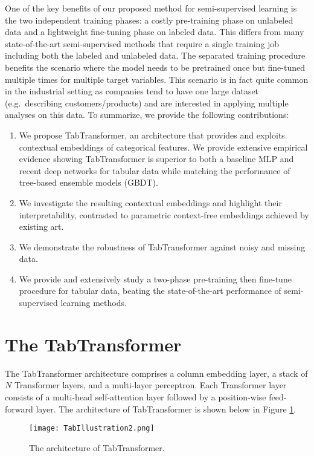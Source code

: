 One of the key benefits of our proposed method for semi-supervised learning is the two independent training phases: 
a costly pre-training phase on unlabeled data and a lightweight fine-tuning phase on labeled data. 
This differs from many state-of-the-art semi-supervised methods \citep{chapelle2009semi, oliver2018realistic, stretcu_graph_2019} that require a single training job including both the labeled and unlabeled data. 
The separated training procedure benefits the scenario where the model needs to be pretrained once but fine-tuned multiple times for multiple target variables.
This scenario is in fact quite common in the industrial setting as companies tend to have one large dataset (e.g.\ describing customers/products) and are interested in applying multiple analyses on this data. %
To summarize, we provide the following contributions: 
\begin{enumerate}
\item We propose TabTransformer, an architecture that provides and exploits contextual embeddings of categorical features. We provide extensive empirical evidence showing TabTransformer
is superior to both a baseline MLP and recent deep networks for tabular data while matching the performance of tree-based ensemble models (GBDT).

\item We investigate the resulting contextual embeddings and highlight their interpretability, contrasted to parametric context-free embeddings achieved by existing art.

\item We demonstrate the robustness of TabTransformer against noisy and missing data. %

\item We provide and extensively study a two-phase pre-training then fine-tune procedure for tabular data, beating the state-of-the-art performance of semi-supervised learning methods.
\end{enumerate}

\section{The TabTransformer}\label{sec:TabTransformer}
The TabTransformer architecture comprises a column embedding layer, a stack of $N$ Transformer layers, and a multi-layer perceptron. Each Transformer layer \citep{vaswani2017attention} consists of a multi-head self-attention layer followed by a position-wise feed-forward layer. The architecture of TabTransformer is shown below in Figure \ref{fig:architecture}.
\begin{figure}[h]
\centering
\texttt{[image: TabIllustration2.png]} 
\caption{The architecture of TabTransformer.}
\label{fig:architecture}
\end{figure}

